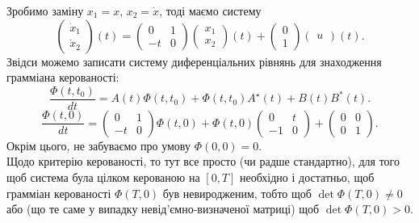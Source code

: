 \begin{solution}
    Зробимо заміну $x_1 = x$, $x_2 = \dot x$, тоді маємо систему \[ \begin{pmatrix} \dot x_1 \\ \dot x_2 \end{pmatrix} (t) = \begin{pmatrix} 0 & 1 \\ -t & 0 \end{pmatrix} \begin{pmatrix} x_1 \\ x_2 \end{pmatrix} (t) + \begin{pmatrix} 0 \\ 1 \end{pmatrix} \begin{pmatrix} u \end{pmatrix} (t). \]
    Звідси можемо записати систему диференціальних рівнянь для знаходження грамміана керованості:
    \[ \dfrac{\Phi(t, t_0)}{dt} = A(t) \Phi(t, t_0) + \Phi(t, t_0) A^\star(t) + B(t) B^*(t). \]
    \[ \dfrac{\Phi(t, 0)}{dt} = \begin{pmatrix} 0 & 1 \\ -t & 0 \end{pmatrix} \Phi(t, 0) + \Phi(t, 0) \begin{pmatrix} 0 & t \\ -1 & 0 \end{pmatrix} + \begin{pmatrix} 0 & 0 \\ 0 & 1 \end{pmatrix}. \]
    Окрім цього, не забуваємо про умову $\Phi(0, 0) = 0$.\\
    
    Щодо критерію керованості, то тут все просто (чи радше стандартно), для того щоб система була цілком керованою на $[0, T]$ необхідно і достатньо, щоб грамміан керованості $\Phi(T, 0)$ був невиродженим, тобто щоб $\det \Phi(T, 0) \ne 0$ або (що те саме у випадку невід'ємно-визначеної матриці) щоб $\det \Phi(T, 0) > 0$.
\end{solution}

